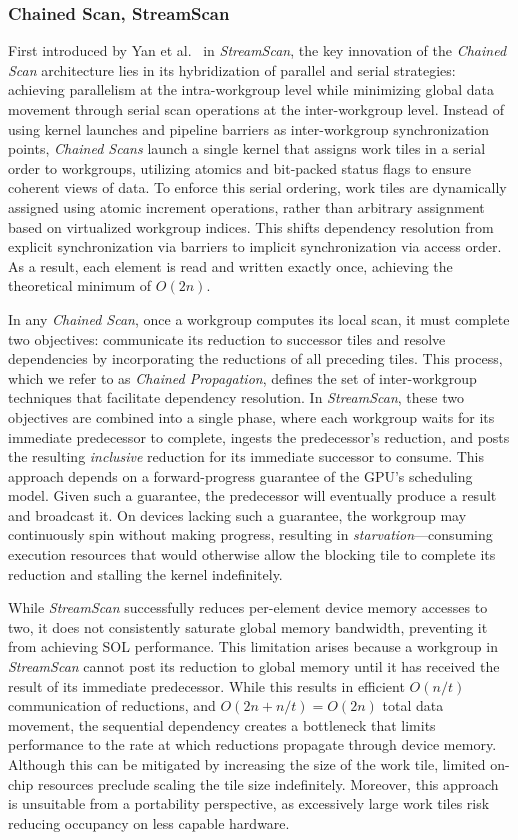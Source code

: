 \documentclass[sigconf,screen]{acmart}
\begin{document}
\subsubsection{Chained Scan, StreamScan}
First introduced by Yan et al.~\cite{10.1145/2442516.2442539} in \emph{StreamScan}, the key innovation of the \emph{Chained Scan} architecture lies in its hybridization of parallel and serial strategies: achieving parallelism at the intra-workgroup level while minimizing global data movement through serial scan operations at the inter-workgroup level. Instead of using kernel launches and pipeline barriers as inter-workgroup synchronization points, \emph{Chained Scans} launch a single kernel that assigns work tiles in a serial order to workgroups, utilizing atomics and bit-packed status flags to ensure coherent views of data. To enforce this serial ordering, work tiles are dynamically assigned using atomic increment operations, rather than arbitrary assignment based on virtualized workgroup indices. This shifts dependency resolution from explicit synchronization via barriers to implicit synchronization via access order. As a result, each element is read and written exactly once, achieving the theoretical minimum of $O(2n)$.

In any \emph{Chained Scan}, once a workgroup computes its local scan, it must complete two objectives: communicate its reduction to successor tiles and resolve dependencies by incorporating the reductions of all preceding tiles. This process, which we refer to as \emph{Chained Propagation}, defines the set of inter-workgroup techniques that facilitate dependency resolution. In \emph{StreamScan}, these two objectives are combined into a single phase, where each workgroup waits for its immediate predecessor to complete, ingests the predecessor's reduction, and posts the resulting \emph{inclusive} reduction for its immediate successor to consume. This approach depends on a forward-progress guarantee of the GPU's scheduling model. Given such a guarantee, the predecessor will eventually produce a result and broadcast it. On devices lacking such a guarantee, the workgroup may continuously spin without making progress, resulting in \emph{starvation}---consuming execution resources that would otherwise allow the blocking tile to complete its reduction and stalling the kernel indefinitely.

While \emph{StreamScan} successfully reduces per-element device memory accesses to two, it does not consistently saturate global memory bandwidth, preventing it from achieving SOL performance. This limitation arises because a workgroup in \emph{StreamScan} cannot post its reduction to global memory until it has received the result of its immediate predecessor. While this results in efficient $O(n/t)$ communication of reductions, and $O(2n+ n/t)= O(2n)$ total data movement, the sequential dependency creates a bottleneck that limits performance to the rate at which reductions propagate through device memory. Although this can be mitigated by increasing the size of the work tile, limited on-chip resources preclude scaling the tile size indefinitely. Moreover, this approach is unsuitable from a portability perspective, as excessively large work tiles risk reducing occupancy on less capable hardware.
\end{document}
